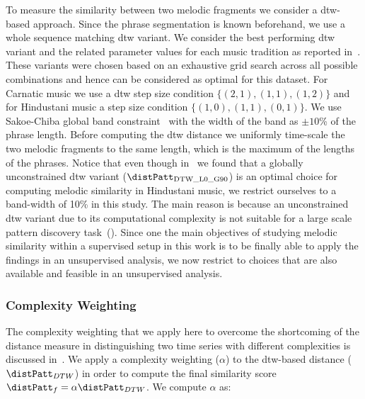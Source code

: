 To measure the similarity between two melodic fragments we consider a \gls{dtw}-based approach. Since the phrase segmentation is known beforehand, we use a whole sequence matching \gls{dtw} variant. We consider the best performing \gls{dtw} variant and the related parameter values for each music tradition as reported in~. These variants were chosen based on an exhaustive grid search across all possible combinations and hence can be considered as optimal for this dataset. For Carnatic music we use a \gls{dtw} step size condition $\lbrace(2,1), (1,1), (1,2)\rbrace$  and for Hindustani music a step size condition $\lbrace(1,0), (1,1), (0,1)\rbrace$.  We use Sakoe-Chiba global band constraint~\cite{Sakoe78TASLP} with the width of the band as $\pm10$\% of the phrase length. Before computing the \gls{dtw} distance we uniformly time-scale the two melodic fragments to the same length, which is the maximum of the lengths of the phrases. Notice that even though in~ we found that a globally unconstrained \gls{dtw} variant ($\distPatt_{\mathrm{DTW\_L0\_G90}}$) is an optimal choice for computing melodic similarity in Hindustani music, we restrict ourselves to a band-width of 10\% in this study. The main reason is because an unconstrained \gls{dtw} variant due to its computational complexity is not suitable for a large scale pattern discovery task~(). Since one the main objectives of studying melodic similarity within a supervised setup in this work is to be finally able to apply the findings in an unsupervised analysis, we now restrict to choices that are also available and feasible in an unsupervised analysis. 


\subsubsection{Complexity Weighting}
\label{sec:patterns_improving_similarity_complexity_invariance_weighting}

The complexity weighting that we apply here to overcome the shortcoming of the distance measure in distinguishing two time series with different complexities is discussed in~\cite{batista2011complexity}. We apply a complexity weighting ($\alpha$) to the \gls{dtw}-based distance ($\distPatt_{DTW}$) in order to compute the final similarity score $\distPatt_{f}=\alpha \distPatt_{DTW}$. We compute $\alpha$ as:


